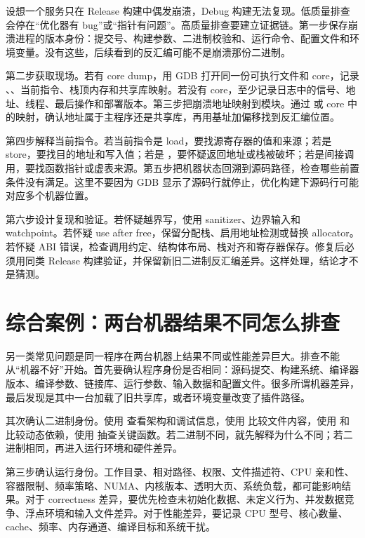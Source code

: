 设想一个服务只在 Release 构建中偶发崩溃，Debug 构建无法复现。低质量排查会停在“优化器有 bug”或“指针有问题”。高质量排查要建立证据链。第一步保存崩溃进程的版本身份：提交号、构建参数、二进制校验和、运行命令、配置文件和环境变量。没有这些，后续看到的反汇编可能不是崩溃那份二进制。

第二步获取现场。若有 core dump，用 GDB 打开同一份可执行文件和 core，记录 、、当前指令、栈顶内存和共享库映射。若没有 core，至少记录日志中的信号、地址、线程、最后操作和部署版本。第三步把崩溃地址映射到模块。通过  或 core 中的映射，确认地址属于主程序还是共享库，再用基址加偏移找到反汇编位置。

第四步解释当前指令。若当前指令是 load，要找源寄存器的值和来源；若是 store，要找目的地址和写入值；若是 ，要怀疑返回地址或栈被破坏；若是间接调用，要找函数指针或虚表来源。第五步把机器状态回溯到源码路径，检查哪些前置条件没有满足。这里不要因为 GDB 显示了源码行就停止，优化构建下源码行可能对应多个机器位置。

第六步设计复现和验证。若怀疑越界写，使用 sanitizer、边界输入和 watchpoint。若怀疑 use after free，保留分配栈、启用地址检测或替换 allocator。若怀疑 ABI 错误，检查调用约定、结构体布局、栈对齐和寄存器保存。修复后必须用同类 Release 构建验证，并保留新旧二进制反汇编差异。这样处理，结论才不是猜测。

\section{综合案例：两台机器结果不同怎么排查}

另一类常见问题是同一程序在两台机器上结果不同或性能差异巨大。排查不能从“机器不好”开始。首先要确认程序身份是否相同：源码提交、构建系统、编译器版本、编译参数、链接库、运行参数、输入数据和配置文件。很多所谓机器差异，最后发现是其中一台加载了旧共享库，或者环境变量改变了插件路径。

其次确认二进制身份。使用  查看架构和调试信息，使用  比较文件内容，使用  和  比较动态依赖，使用  抽查关键函数。若二进制不同，就先解释为什么不同；若二进制相同，再进入运行环境和硬件差异。

第三步确认运行身份。工作目录、相对路径、权限、文件描述符、CPU 亲和性、容器限制、频率策略、NUMA、内核版本、透明大页、系统负载，都可能影响结果。对于 correctness 差异，要优先检查未初始化数据、未定义行为、并发数据竞争、浮点环境和输入文件差异。对于性能差异，要记录 CPU 型号、核心数量、cache、频率、内存通道、编译目标和系统干扰。

